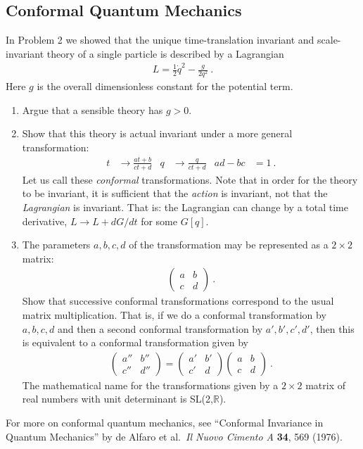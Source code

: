 \documentclass[12pt]{article}
\numberwithin{equation}{section}    %
\begin{document}
\subsection{Conformal Quantum Mechanics}

In Problem 2 we showed that the unique time-translation invariant and scale-invariant theory of a single particle is described by a Lagrangian
\begin{align*}
	L = \frac{1}{2}\dot q^2 - \frac{g}{2q^2} \ .
\end{align*}
Here $g$ is the overall dimensionless constant for the potential term. 
\begin{enumerate}
	\item Argue that a sensible theory has $g>0$.
	\item Show that this theory is actual invariant under a more general transformation:
	\begin{align*}
		t &\to \frac{at+b}{ct+d}
		&
		q &\to \frac{q}{ct+d}
		&
		ad - bc &=1 \ .
	\end{align*}
	Let us call these \emph{conformal} transformations. Note that in order for the theory to be invariant, it is sufficient that the \emph{action} is invariant, not that the \emph{Lagrangian} is invariant. That is: the Lagrangian can change by a total time derivative, $L \to L + dG/dt$ for some $G[q]$.
	\item The parameters $a,b,c,d$ of the transformation may be represented as a $2\times 2$ matrix:
	\begin{align*}
		\begin{pmatrix}
			a & b\\
			c & d
		\end{pmatrix} \ .
	\end{align*}
	Show that successive conformal transformations correspond to the usual matrix multiplication. That is, if we do a conformal transformation by $a,b,c,d$ and then a second conformal transformation by $a',b',c',d'$, then this is equivalent to a conformal transformation given by
	\begin{align*}
		\begin{pmatrix}
			a'' & b'' \\
			c'' & d''
		\end{pmatrix}
		=
		\begin{pmatrix}
			a' & b' \\
			c' & d
		\end{pmatrix}
		\begin{pmatrix}
			a & b \\
			c & d
		\end{pmatrix} \ .
	\end{align*}
	The mathematical name for the transformations given by a $2\times 2$ matrix of real numbers with unit determinant is SL(2,$\mathbb{R}$). 
\end{enumerate}
For more on conformal quantum mechanics, see ``Conformal Invariance in Quantum Mechanics'' by de Alfaro et al.\ \emph{Il Nuovo Cimento A} \textbf{34}, 569 (1976).
\end{document}
